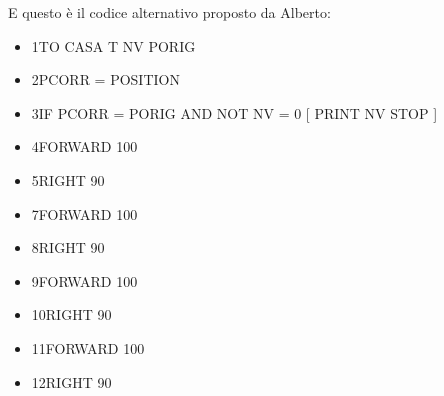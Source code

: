 E questo è il codice alternativo proposto da Alberto:  

\vskip 1cm

\begin{minipage}{1.0\textwidth}
\begin{itemize}[itemsep=-3pt,parsep=2pt]
\item[] \hspace{0.5cm}  1\hspace{8pt}TO CASA T NV PORIG 
\item[] \hspace{0.5cm}  2\hspace{8pt}\hspace{8pt}PCORR = POSITION
\item[] \hspace{0.5cm}	3\hspace{8pt}\hspace{8pt}IF PCORR = PORIG  AND NOT NV = 0 [ PRINT NV STOP ] 
\item[] \hspace{0.5cm}  4\hspace{8pt}\hspace{8pt}FORWARD 100 
\item[] \hspace{0.5cm}  5\hspace{8pt}\hspace{8pt}RIGHT 90 
\item[] \hspace{0.5cm}  7\hspace{8pt}\hspace{8pt}FORWARD 100 
\item[] \hspace{0.5cm}  8\hspace{8pt}\hspace{8pt}RIGHT 90 
\item[] \hspace{0.5cm}  9\hspace{8pt}\hspace{8pt}FORWARD 100 
\item[] \hspace{0.3cm} 10\hspace{8pt}\hspace{8pt}RIGHT 90 
\item[] \hspace{0.3cm} 11\hspace{8pt}\hspace{8pt}FORWARD 100 
\item[] \hspace{0.3cm} 12\hspace{8pt}\hspace{8pt}RIGHT 90 

\end{itemize}
\end{minipage}
